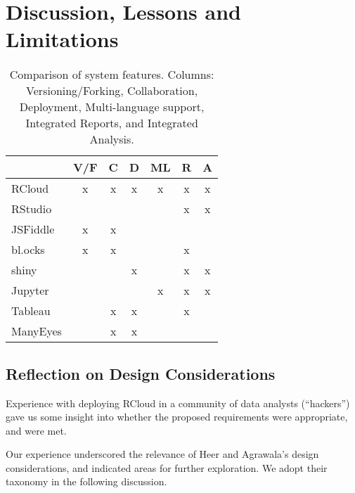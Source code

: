 \section{Discussion, Lessons and Limitations}
\label{sec:discussion}

\begin{table}
  \centering
  \begin{tabular}{l|cccccc}
    & V/F & C & D & ML & R & A \\
    \hline
RCloud     &       x            &       x       &     x      &      x        &           x        &           x         \\
RStudio    &                    &               &            &               &           x        &           x         \\
JSFiddle   &       x            &       x       &            &               &                    &                     \\
bl.ocks    &       x            &       x       &            &               &           x        &                     \\
shiny      &                    &               &     x      &               &           x        &           x         \\
Jupyter    &                    &               &            &      x        &           x        &           x         \\
Tableau    &                    &      x        &     x      &               &           x        &                     \\
ManyEyes   &                    &      x        &     x      &               &                    &                     
  \end{tabular}
  \caption{Comparison of system features. Columns: Versioning/Forking, Collaboration, Deployment, Multi-language support, Integrated Reports, and Integrated Analysis.}
\end{table}

\subsection{Reflection on Design Considerations}

Experience with deploying RCloud in a community of data analysts
(``hackers'') gave us some insight into whether the proposed
requirements were appropriate, and were met.

Our experience underscored the relevance of Heer and Agrawala's design
considerations, and indicated areas for further exploration. We adopt
their taxonomy in the following discussion.

